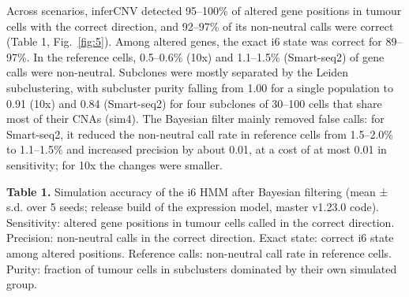 
Across scenarios, inferCNV detected 95--100\% of altered gene positions in tumour cells with the correct direction, and 92--97\% of its non-neutral calls were correct (Table 1, Fig.~\ref{fig:5}). Among altered genes, the exact i6 state was correct for 89--97\%. In the reference cells, 0.5--0.6\% (10x) and 1.1--1.5\% (Smart-seq2) of gene calls were non-neutral. Subclones were mostly separated by the Leiden subclustering, with subcluster purity falling from 1.00 for a single population to 0.91 (10x) and 0.84 (Smart-seq2) for four subclones of 30--100 cells that share most of their CNAs (sim4). The Bayesian filter mainly removed false calls: for Smart-seq2, it reduced the non-neutral call rate in reference cells from 1.5--2.0\% to 1.1--1.5\% and increased precision by about 0.01, at a cost of at most 0.01 in sensitivity; for 10x the changes were smaller.

\textbf{Table 1.} Simulation accuracy of the i6 HMM after Bayesian filtering (mean ± s.d. over 5 seeds; release build of the expression model, master v1.23.0 code). Sensitivity: altered gene positions in tumour cells called in the correct direction. Precision: non-neutral calls in the correct direction. Exact state: correct i6 state among altered positions. Reference calls: non-neutral call rate in reference cells. Purity: fraction of tumour cells in subclusters dominated by their own simulated group.

